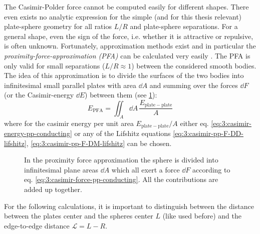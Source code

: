The Casimir-Polder force cannot be computed easily for different shapes. There even exists no analytic expression for the simple (and for this thesis relevant) plate-sphere geometry for all ratios $L/R$ and plate-sphere separations.
For a general shape, even the sign of the force, i.e. whether it is attractive or repulsive, is often unknown.
Fortunately, approximation methods exist and in particular the \emph{proximity-force-approximation (PFA)} can be calculated very easily \cite{Hartmann_2018,Emig_2007a,Bulgac_2006}.
The PFA is only valid for small separations ($L/R \approx 1$) between the considered smooth bodies.
The idea of this approximation is to divide the surfaces of the two bodies into infinitesimal small parallel plates with area $\dd A$ and summing over the forces $\dd F$ (or the Casimir-energy $\dd E$) between them (see \cref{fig:3:PFA}):
\begin{equation}\label{eq:3:pfa}
  E_\mathrm{PFA} = \iint_A \dd A \, \frac{E_\mathrm{plate-plate}}{A}
\end{equation}
where for the casimir energy per unit area $E_\mathrm{plate-plate}/A$ either eq. \eqref{eq:3:casimir-energy-pp-conducting} or any of the Lifshitz equations \eqref{eq:3:casimir-pp-F-DD-lifshitz}, \eqref{eq:3:casimir-pp-F-DM-lifshitz} can be chosen.
\begin{figure}[!htbp]
  \centering
  \def\svgwidth{0.55\textwidth}
  
  \caption{In the proximity force approximation the sphere is divided into infinitesimal plane areas $\dd A$ which all exert a force $\dd F$ according to eq. \eqref{eq:3:casimir-force-pp-conducting}. All the contributions are added up together.}
  \label{fig:3:PFA}
\end{figure}
For the following calculations, it is important to distinguish between the distance between the plates center and the spheres center $L$ (like used before) and the edge-to-edge distance $\mathscr{L} = L - R$.

